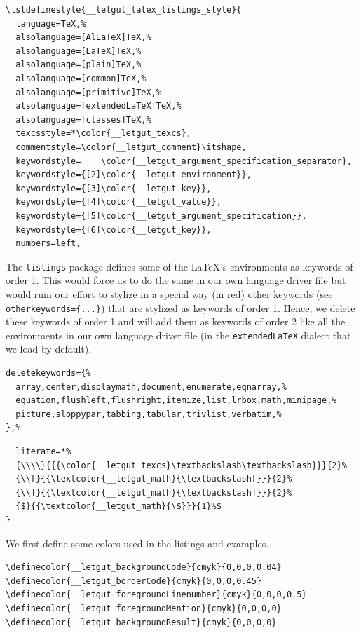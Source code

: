 \documentclass{letgut}
\begin{document}
\begin{lstlisting}
\lstdefinestyle{__letgut_latex_listings_style}{
  language=TeX,%
  alsolanguage=[AlLaTeX]TeX,%
  alsolanguage=[LaTeX]TeX,%
  alsolanguage=[plain]TeX,%
  alsolanguage=[common]TeX,%
  alsolanguage=[primitive]TeX,%
  alsolanguage=[extendedLaTeX]TeX,%
  alsolanguage=[classes]TeX,%
  texcsstyle=*\color{__letgut_texcs},
  commentstyle=\color{__letgut_comment}\itshape,
  keywordstyle=    \color{__letgut_argument_specification_separator},
  keywordstyle={[2]\color{__letgut_environment}},
  keywordstyle={[3]\color{__letgut_key}},
  keywordstyle={[4]\color{__letgut_value}},
  keywordstyle={[5]\color{__letgut_argument_specification}},
  keywordstyle={[6]\color{__letgut_key}},
  numbers=left,
\end{lstlisting}

The \lstinline+listings+ package defines some of the LaTeX's environments as keywords of
order 1. This would force us to do the same in our own language driver file but
would ruin our effort to stylize in a special way (in red) other keywords (see
\lstinline+otherkeywords={...}+) that are stylized as keywords of order 1. Hence, we
delete these keywords of order 1 and will add them as keywords of order 2 like
all the environments in our own language driver file (in the \lstinline+extendedLaTeX+ dialect
that we load by default).

\begin{lstlisting}
deletekeywords={%
  array,center,displaymath,document,enumerate,eqnarray,%
  equation,flushleft,flushright,itemize,list,lrbox,math,minipage,%
  picture,sloppypar,tabbing,tabular,trivlist,verbatim,%
},%
\end{lstlisting}

\begin{lstlisting}
  literate=*%
  {\\\\}{{{\color{__letgut_texcs}\textbackslash\textbackslash}}}{2}%
  {\\[}{{\textcolor{__letgut_math}{\textbackslash[}}}{2}%
  {\\]}{{\textcolor{__letgut_math}{\textbackslash]}}}{2}%
  {$}{{\textcolor{__letgut_math}{\$}}}{1}%$
}
\end{lstlisting}

We first define some colors used in the listings and examples.

\begin{lstlisting}
\definecolor{__letgut_backgroundCode}{cmyk}{0,0,0,0.04}
\definecolor{__letgut_borderCode}{cmyk}{0,0,0,0.45}
\definecolor{__letgut_foregroundLinenumber}{cmyk}{0,0,0,0.5}
\definecolor{__letgut_foregroundMention}{cmyk}{0,0,0,0}
\definecolor{__letgut_backgroundResult}{cmyk}{0,0,0,0}
\end{lstlisting}
\end{document}
